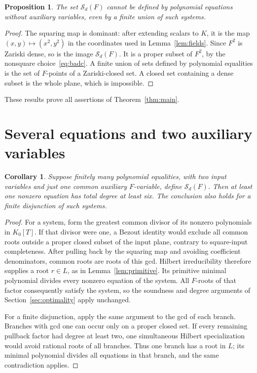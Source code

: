 \documentclass[11pt,a4paper]{article}
\newtheorem{proposition}[theorem]{Proposition}
\newtheorem{corollary}[theorem]{Corollary}
\begin{document}
\begin{proposition}\label{prop:no-aux}
The set $\mathcal S_d(F)$ cannot be defined by polynomial equations
without auxiliary variables, even by a finite union of such systems.
\end{proposition}
\begin{proof}
The squaring map is dominant: after extending scalars to $K$, it is
the map $(x,y)\mapsto(x^2,y^2)$ in the coordinates used in
Lemma~\ref{lem:fields}. Since $F^2$ is Zariski dense, so is the image
$\mathcal S_d(F)$. It is a proper subset of $F^2$, by the nonsquare
choice~\eqref{eq:badc}. A finite union of sets defined by polynomial
equalities is the set of $F$-points of a Zariski-closed set. A closed
set containing a dense subset is the whole plane, which is impossible.
\end{proof}

These results prove all assertions of Theorem~\ref{thm:main}.

\section{Several equations and two auxiliary variables}

\begin{corollary}\label{cor:systems}
Suppose finitely many polynomial equalities, with two input variables
and just one common auxiliary $F$-variable, define $\mathcal S_d(F)$.
Then at least one nonzero equation has total degree at least six.
The conclusion also holds for a finite disjunction of such systems.
\end{corollary}
\begin{proof}
For a system, form the greatest common divisor of its nonzero
polynomials in $K_0[T]$. If that divisor were one, a Bezout identity
would exclude all common roots outside a proper closed subset of the
input plane, contrary to square-input completeness. After pulling
back by the squaring map and avoiding coefficient denominators, common
roots are roots of this gcd. Hilbert irreducibility therefore supplies
a root $r\in L$, as in Lemma~\ref{lem:primitive}. Its primitive minimal
polynomial divides every nonzero equation of the system. All $F$-roots
of that factor consequently satisfy the system, so the soundness and
degree arguments of Section~\ref{sec:optimality} apply unchanged.

For a finite disjunction, apply the same argument to the gcd of each
branch. Branches with gcd one can occur only on a proper closed set.
If every remaining pullback factor had degree at least two, one
simultaneous Hilbert specialization would avoid rational roots of all
branches. Thus one branch has a root in $L$; its minimal polynomial
divides all equations in that branch, and the same contradiction applies.
\end{proof}
\end{document}
